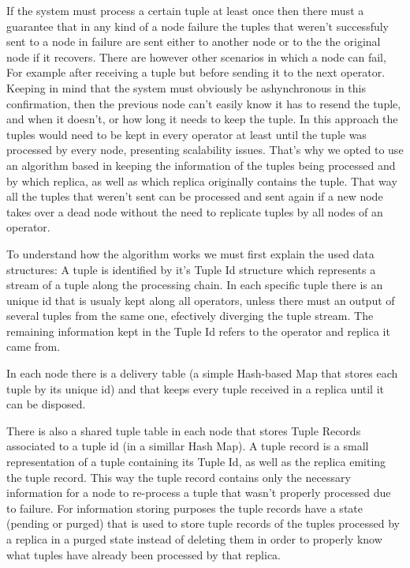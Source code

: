 \documentclass[times, 10pt,twocolumn]{article}
\begin{document}


If the system must process a certain tuple at least once then there must a
guarantee that in any kind of a node failure the tuples that weren't
successfuly sent to a node in failure are sent either to another node or
to the the original node if it recovers. There are however other scenarios
in which a node can fail, For example after receiving a tuple but before
sending it to the next operator. Keeping in mind that the system must
obviously be ashynchronous in this confirmation, then the previous node
can't easily know it has to resend the tuple, and when it doesn't, or how
long it needs to keep the tuple.  In this approach the tuples would need
to be kept in every operator at least until the tuple was processed by
every node, presenting scalability issues. That's why we opted to use an
algorithm based in keeping the information of the tuples being processed
and by which replica, as well as which replica originally contains the
tuple.  That way all the tuples that weren't sent can be processed and
sent again if a new node takes over a dead node without the need to
replicate tuples by all nodes of an operator.



To understand how the algorithm works we must first explain the used data
structures: A tuple is identified by it's Tuple Id structure which
represents a stream of a tuple along the processing chain. In each
specific tuple there is an unique id that is usualy kept along all
operators, unless there must an output of several tuples from the same
one, efectively diverging the tuple stream.  The remaining information
kept in the Tuple Id refers to the operator and replica it came from. 

In each node there is a delivery table (a simple Hash-based Map that
stores each tuple by its unique id) and that keeps every tuple received in
a replica until it can be disposed.  

There is also a shared tuple table in each node that stores Tuple Records
associated to a tuple id (in a simillar Hash Map). A tuple record is a
small representation of a tuple containing its Tuple Id, as well as the
replica emiting the tuple record. This way the tuple record contains only
the necessary information for a node to re-process a tuple that wasn't
properly processed due to failure. For information storing purposes the
tuple records have a state (pending or purged) that is used to store tuple
records of the tuples processed by a replica in a purged state instead of
deleting them in order to properly know what tuples have already been
processed by that replica.
\end{document}
